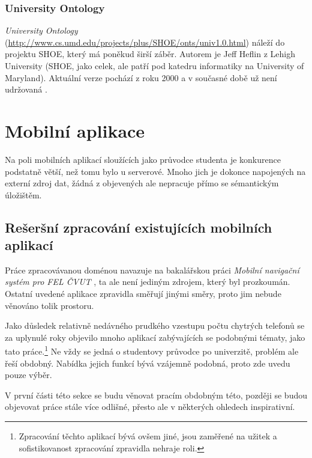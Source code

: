 \subsubsection{University Ontology}
\emph{University Ontology} (\url{http://www.cs.umd.edu/projects/plus/SHOE/onts/univ1.0.html}) náleží do projektu \gls{SHOE}, který má poněkud širší záběr. Autorem je Jeff Heflin z Lehigh University (\gls{SHOE}, jako celek, ale patří pod katedru informatiky na University of Maryland). Aktuální verze pochází z roku 2000 a v současné době už není udržovaná \cite{Shoe}.


\section{Mobilní aplikace}
Na poli mobilních aplikací sloužících jako průvodce studenta je konkurence podstatně větší, než tomu bylo u serverové. Mnoho jich je dokonce napojených na externí zdroj dat, žádná z objevených ale nepracuje přímo se sémantickým úložištěm.

\subsection{Rešeršní zpracování existujících mobilních aplikací}
Práce zpracovávanou doménou navazuje na bakalářskou práci \textit{Mobilní navigační systém pro FEL ČVUT} \cite{Bakalarka}, ta ale není jediným zdrojem, který byl prozkoumán. Ostatní uvedené aplikace zpravidla směřují jinými směry, proto jim nebude věnováno tolik prostoru.

Jako důsledek relativně nedávného prudkého vzestupu počtu chytrých telefonů se za uplynulé roky objevilo mnoho aplikací zabývajících se podobnými tématy, jako tato práce.\footnote{Zpracování těchto aplikací bývá ovšem jiné, jsou zaměřené na užitek a sofistikovanost zpracování zpravidla nehraje roli.} Ne vždy se jedná o studentovy průvodce po univerzitě, problém ale řeší obdobný. Nabídka jejich funkcí bývá vzájemně podobná, proto zde uvedu pouze výběr.

V první části této sekce se budu věnovat pracím obdobným této, později se budou objevovat práce stále více odlišné, přesto ale v některých ohledech inspirativní.

